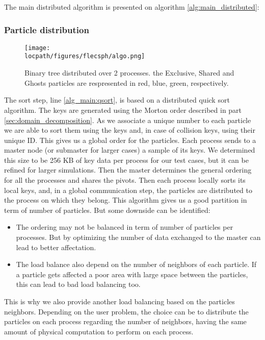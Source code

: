 The main distributed algorithm is presented on algorithm \ref{alg:main_distributed}:

\subsubsection{Particle distribution}

\begin{figure*}
\centering
\texttt{[image: \\locpath/figures/flecsph/algo.png]}
\caption[Binary tree and distribution over two processes]{Binary tree distributed over 2 processes. the Exclusive, Shared and Ghosts particles  are respresented in red, blue, green, respectively.}
\label{fig:big_tree}
\end{figure*}

The sort step, line \ref{alg_main:qsort}, is based on a distributed quick sort algorithm. 
The keys are generated using the Morton order described in part \ref{sec:domain_decomposition}. 
As we associate a unique number to each particle we are able to sort them using the keys and, in case of collision keys, using their unique ID. 
This gives us a global order for the particles. 
Each process sends to a master node (or submaster for larger cases) a sample of its keys. 
We determined this size to be 256 KB of key data per process for our test cases, but it can be refined for larger simulations. 
Then the master determines the general ordering for all the processes and shares the pivots. 
Then each process locally sorts its local keys, and, in a global communication step, the particles are distributed to the process on which they belong. 
This algorithm gives us a good partition in term of number of particles. 
But some downside can be identified:
\begin{itemize}
	\item The ordering may not be balanced in term of number of particles per processes. But by optimizing the number of data exchanged to the master can lead to better affectation. 
	\item The load balance also depend on the number of neighbors of each particle. If a particle gets affected a poor area with large space between the particles, this can lead to bad load balancing too. 
\end{itemize}
This is why we also provide another load balancing based on the particles neighbors. 
Depending on the user problem, the choice can be to distribute the particles on each process regarding the number of neighbors, having the same amount of physical computation to perform on each process. 

